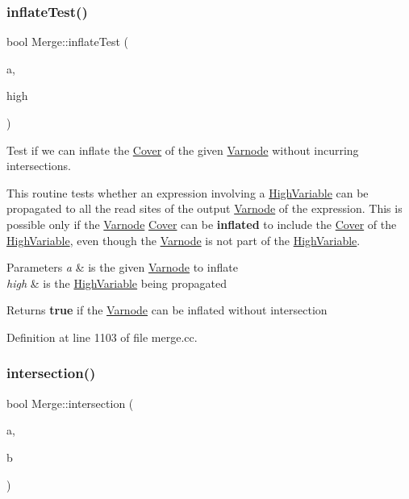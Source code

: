 \subsubsection{\texorpdfstring{inflateTest()}{inflateTest()}}
{\footnotesize\ttfamily bool Merge\+::inflate\+Test (\begin{DoxyParamCaption}\item[{\mbox{\hyperlink{class_varnode}{Varnode}} $\ast$}]{a,  }\item[{\mbox{\hyperlink{class_high_variable}{High\+Variable}} $\ast$}]{high }\end{DoxyParamCaption})}



Test if we can inflate the \mbox{\hyperlink{class_cover}{Cover}} of the given \mbox{\hyperlink{class_varnode}{Varnode}} without incurring intersections. 

This routine tests whether an expression involving a \mbox{\hyperlink{class_high_variable}{High\+Variable}} can be propagated to all the read sites of the output \mbox{\hyperlink{class_varnode}{Varnode}} of the expression. This is possible only if the \mbox{\hyperlink{class_varnode}{Varnode}} \mbox{\hyperlink{class_cover}{Cover}} can be {\bfseries{inflated}} to include the \mbox{\hyperlink{class_cover}{Cover}} of the \mbox{\hyperlink{class_high_variable}{High\+Variable}}, even though the \mbox{\hyperlink{class_varnode}{Varnode}} is not part of the \mbox{\hyperlink{class_high_variable}{High\+Variable}}. 
\begin{DoxyParams}{Parameters}
{\em a} & is the given \mbox{\hyperlink{class_varnode}{Varnode}} to inflate \\
\hline
{\em high} & is the \mbox{\hyperlink{class_high_variable}{High\+Variable}} being propagated \\
\hline
\end{DoxyParams}
\begin{DoxyReturn}{Returns}
{\bfseries{true}} if the \mbox{\hyperlink{class_varnode}{Varnode}} can be inflated without intersection 
\end{DoxyReturn}


Definition at line 1103 of file merge.\+cc.

\mbox{\label{class_merge_abc0c74b3892b9724fd4091a126631089}} 
\subsubsection{\texorpdfstring{intersection()}{intersection()}}
{\footnotesize\ttfamily bool Merge\+::intersection (\begin{DoxyParamCaption}\item[{\mbox{\hyperlink{class_high_variable}{High\+Variable}} $\ast$}]{a,  }\item[{\mbox{\hyperlink{class_high_variable}{High\+Variable}} $\ast$}]{b }\end{DoxyParamCaption})}



